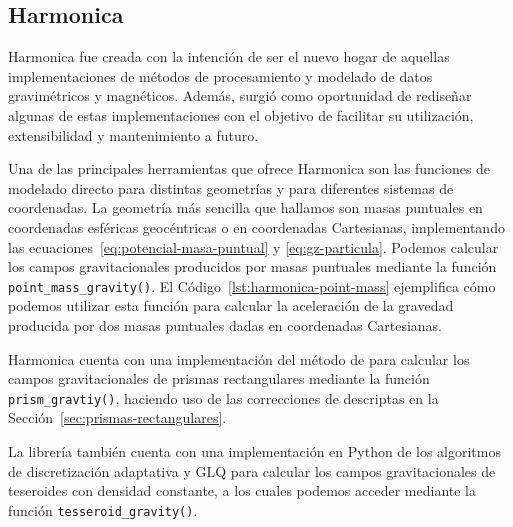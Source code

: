 \subsection{Harmonica}
\label{sec:harmonica}

Harmonica fue creada con la intención de ser el nuevo hogar de aquellas
implementaciones de métodos de procesamiento y modelado de datos gravimétricos
y magnéticos.
Además, surgió como oportunidad de rediseñar algunas de estas implementaciones
con el objetivo de facilitar su utilización, extensibilidad y mantenimiento
a futuro.

Una de las principales herramientas que ofrece Harmonica son las
funciones de modelado directo para distintas geometrías y para diferentes
sistemas de coordenadas.
La geometría más sencilla que hallamos son masas puntuales en coordenadas
esféricas geocéntricas o en coordenadas Cartesianas, implementando las
ecuaciones~\ref{eq:potencial-masa-puntual} y \ref{eq:gz-particula}.
Podemos calcular los campos gravitacionales producidos por masas puntuales
mediante la función \texttt{point\_mass\_gravity()}.
El Código~\ref{lst:harmonica-point-mass} ejemplifica cómo podemos utilizar esta
función para calcular la aceleración de la gravedad producida por dos masas
puntuales dadas en coordenadas Cartesianas.

Harmonica cuenta con una implementación del método de \citet{nagy2000} para
calcular los campos gravitacionales de prismas rectangulares mediante la
función \texttt{prism\_gravtiy()}, haciendo uso de las correcciones de
\citet{fukushima2020} descriptas en la Sección~\ref{sec:prismas-rectangulares}.

La librería también cuenta con una implementación en Python de los algoritmos
de discretización adaptativa y \ac{GLQ} para calcular los campos
gravitacionales de teseroides con densidad constante, a los cuales podemos
acceder mediante la función \texttt{tesseroid\_gravity()}.



